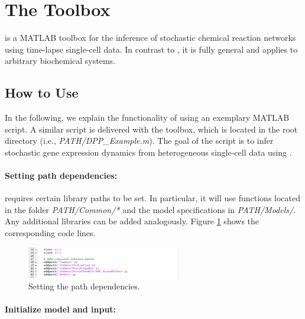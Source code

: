 \documentclass[a4paper, 9pt]{scrartcl}
\begin{document}
\section{The \DPP Toolbox}

\DPP is a MATLAB toolbox for the inference of stochastic chemical reaction networks using time-lapse single-cell data. In contrast to \GuiDPP, it is fully general and applies to arbitrary biochemical systems.

\subsection{How to Use \DPP}
\label{sec:DPP}
In the following, we explain the functionality of \DPP using an exemplary MATLAB script. A similar script is delivered with the toolbox, which is located in the root directory (i.e., \textit{PATH/DPP\_Example.m}). The goal of the script is to infer stochastic gene expression dynamics from heterogeneous single-cell data using \DPP. 

\paragraph{Setting path dependencies:}

\DPP requires certain library paths to be set. In particular, it will use functions located in the folder \textit{PATH/Common/*} and the model specifications in \textit{PATH/Models/}. Any additional libraries can be added analogously. Figure \ref{fig:Paths} shows the corresponding code lines.

\begin{figure}[ht!]
\begin{center}
	\includegraphics[width=0.6\textwidth]{figures/Doc_Paths}
\caption{Setting the path dependencies.}
\label{fig:Paths}
\end{center}
\end{figure}

\paragraph{Initialize model and input:}
\end{document}
